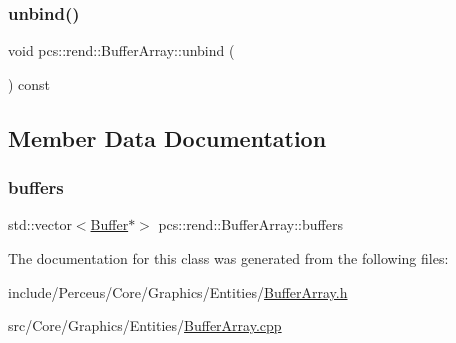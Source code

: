 \mbox{\label{classpcs_1_1rend_1_1BufferArray_a8c00f92e0911c209b26cf99fa2920d95}} 
\subsubsection{\texorpdfstring{unbind()}{unbind()}}
{\footnotesize\ttfamily void pcs\+::rend\+::\+Buffer\+Array\+::unbind (\begin{DoxyParamCaption}{ }\end{DoxyParamCaption}) const\hspace{0.3cm}{\ttfamily [inline]}}



\subsection{Member Data Documentation}
\mbox{\label{classpcs_1_1rend_1_1BufferArray_a9e2281d3dab3361dd8b9aca55c53e4a7}} 
\subsubsection{\texorpdfstring{buffers}{buffers}}
{\footnotesize\ttfamily std\+::vector$<$\hyperlink{classpcs_1_1rend_1_1Buffer}{Buffer}$\ast$$>$ pcs\+::rend\+::\+Buffer\+Array\+::buffers\hspace{0.3cm}{\ttfamily [private]}}



The documentation for this class was generated from the following files\+:\begin{DoxyCompactItemize}
\item 
include/\+Perceus/\+Core/\+Graphics/\+Entities/\hyperlink{BufferArray_8h}{Buffer\+Array.\+h}\item 
src/\+Core/\+Graphics/\+Entities/\hyperlink{BufferArray_8cpp}{Buffer\+Array.\+cpp}\end{DoxyCompactItemize}
